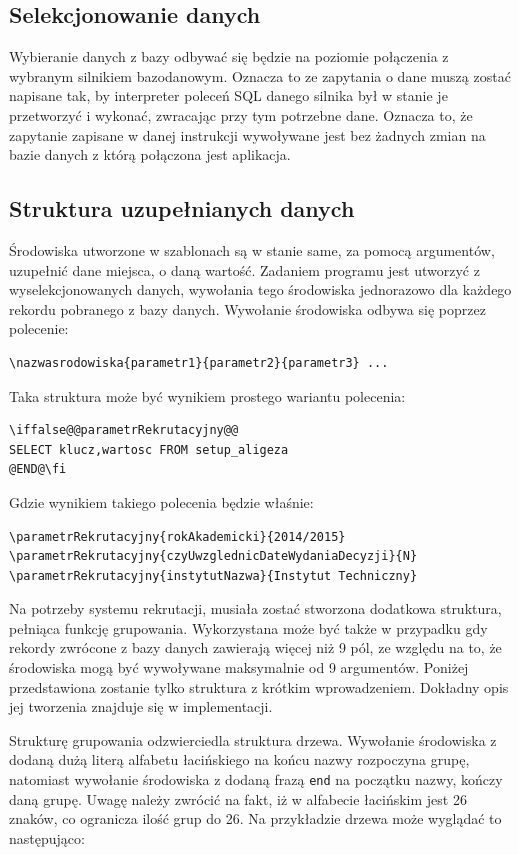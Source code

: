 \subsection{Selekcjonowanie danych}

Wybieranie danych z bazy odbywać się będzie na poziomie połączenia z wybranym silnikiem bazodanowym. Oznacza to ze zapytania o dane muszą zostać napisane tak, by interpreter poleceń SQL danego silnika był w stanie je przetworzyć i wykonać, zwracając przy tym potrzebne dane. Oznacza to, że zapytanie zapisane w danej instrukcji wywoływane jest bez żadnych zmian na bazie danych z którą połączona jest aplikacja.

\subsection{Struktura uzupełnianych danych}

Środowiska utworzone w szablonach są w stanie same, za pomocą argumentów, uzupełnić dane miejsca, o daną wartość. Zadaniem programu jest utworzyć z wyselekcjonowanych danych, wywołania tego środowiska jednorazowo dla każdego rekordu pobranego z bazy danych. Wywołanie środowiska odbywa się poprzez polecenie:
\begin{lstlisting}
\nazwasrodowiska{parametr1}{parametr2}{parametr3} ...
\end{lstlisting}

Taka struktura może być wynikiem prostego wariantu polecenia:
\begin{lstlisting}
\iffalse@@parametrRekrutacyjny@@
SELECT klucz,wartosc FROM setup_aligeza
@END@\fi
\end{lstlisting}
Gdzie wynikiem takiego polecenia będzie właśnie:
\begin{lstlisting}
\parametrRekrutacyjny{rokAkademicki}{2014/2015}
\parametrRekrutacyjny{czyUwzglednicDateWydaniaDecyzji}{N}
\parametrRekrutacyjny{instytutNazwa}{Instytut Techniczny}
\end{lstlisting}

Na potrzeby systemu rekrutacji, musiała zostać stworzona dodatkowa struktura, pełniąca funkcję grupowania. Wykorzystana może być także w przypadku gdy rekordy zwrócone z bazy danych zawierają więcej niż 9 pól, ze względu na to, że środowiska mogą być wywoływane maksymalnie od 9 argumentów. Poniżej przedstawiona zostanie tylko struktura z krótkim wprowadzeniem. Dokładny opis jej tworzenia znajduje się w implementacji.

Strukturę grupowania odzwierciedla struktura drzewa. Wywołanie środowiska z dodaną dużą literą alfabetu łacińskiego na końcu nazwy rozpoczyna grupę, natomiast wywołanie środowiska z dodaną frazą \texttt{end} na początku nazwy, kończy daną grupę. Uwagę należy zwrócić na fakt, iż w alfabecie łacińskim jest 26 znaków, co ogranicza ilość grup do 26. Na przykładzie drzewa może wyglądać to następująco:

